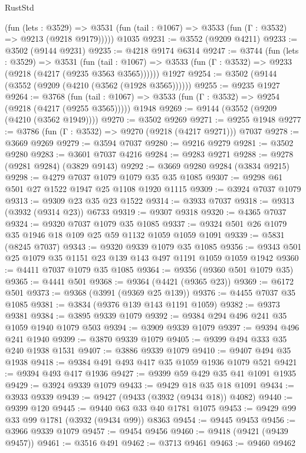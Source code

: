 \begin{lexlean}{RustStd}
\begin{coremodule}
      (fun (lets : @3529) =>
      @3531 (fun (tail : @1067) => @3533 (fun (Γ : @3532) => @9213 (@9218 @9179)))))
    @1035
@9231 := @3552 (@9209 @4211)
@9233 := @3502 (@9144 @9231)
@9235 := @4218 @9174 @6314
@9247 := @3744
    (fun (lets : @3529) =>
    @3531
      (fun (tail : @1067) => @3533 (fun (Γ : @3532) => @9233 (@9218 (@4217 (@9235 @3563 @3565))))))
    @1927
@9254 := @3502 (@9144 (@3552 (@9209 (@4210 (@3562 (@1928 @3565))))))
@9255 := @9235 @1927
@9264 := @3768
    (fun (tail : @1067) => @3533 (fun (Γ : @3532) => @9254 (@9218 (@4217 (@9255 @3565)))))
    @1948
@9269 := @9144 (@3552 (@9209 (@4210 (@3562 @1949))))
@9270 := @3502 @9269
@9271 := @9255 @1948
@9277 := @3786 (fun (Γ : @3532) => @9270 (@9218 (@4217 @9271))) @7037
@9278 := @3669 @9269
@9279 := @3594 @7037
@9280 := @9216 @9279
@9281 := @3502 @9280
@9283 := @3601 @7037 @4216
@9284 := @9283 @9271
@9288 := @9278 (@9281 @9284) (@3829 @9143)
@9292 := @3669 @9280 @9284 (@3834 @9215)
@9298 := @4279 @7037 @1079 @1079 @35 @35 @1085
@9307 := @9298 @61 @501 @27 @1522 @1947 @25 @1108 @1920 @1115
@9309 := @3924 @7037 @1079
@9313 := @9309 @23 @35 @23 @1522
@9314 := @3933 @7037
@9318 := @9313 (@3932 (@9314 @23)) @6733
@9319 := @9307 @9318
@9320 := @4365 @7037
@9324 := @9320 @7037 @1079 @35 @1085
@9337 := @9324 @501 @26 @1079 @35 @1946 @18 @109 @25 @59 @1132 @1059 @1059 @1091
@9339 := @5831 (@8245 @7037)
@9343 := @9320 @9339 @1079 @35 @1085
@9356 := @9343 @501 @25 @1079 @35 @1151 @23 @139 @143 @497 @1191 @1059 @1059 @1942
@9360 := @4411 @7037 @1079 @35 @1085
@9364 := @9356 (@9360 @501 @1079 @35)
@9365 := @4441 @501
@9368 := @9364 (@4421 (@9365 @23))
@9369 := @6172 @501
@9373 := @9368 (@3991 (@9369 @25 @139))
@9376 := @4455 @7037 @35 @1085
@9381 := @3834 (@9376 @139 @143 @1191 @1059)
@9382 := @9373 @9381
@9384 := @3895 @9339 @1079
@9392 := @9384 @294 @496 @241 @35 @1059 @1940 @1079 @503
@9394 := @3909 @9339 @1079
@9397 := @9394 @496 @241 @1940
@9399 := @3870 @9339 @1079
@9405 := @9399 @494 @333 @35 @240 @1938 @1531
@9407 := @3886 @9339 @1079
@9410 := @9407 @494 @35 @1938
@9418 := @9384 @491 @493 @417 @35 @1059 @1936 @1079 @521
@9421 := @9394 @493 @417 @1936
@9427 := @9399 @59 @429 @35 @41 @1091 @1935
@9429 := @3924 @9339 @1079
@9433 := @9429 @18 @35 @18 @1091
@9434 := @3933 @9339
@9439 := @9427 (@9433 (@3932 (@9434 @18)) @4082)
@9440 := @9399 @120
@9445 := @9440 @63 @33 @40 @1781 @1075
@9453 := @9429 @99 @33 @99 @1781 (@3932 (@9434 @99)) @8363
@9454 := @9445 @9453
@9456 := @3966 @9339 @1079
@9457 := @9454 @9456
@9460 := @9418 (@9421 (@9439 @9457))
@9461 := @3516 @491
@9462 := @3713 @9461
@9463 := @9460 @9462

\end{coremodule}
\end{lexlean}
